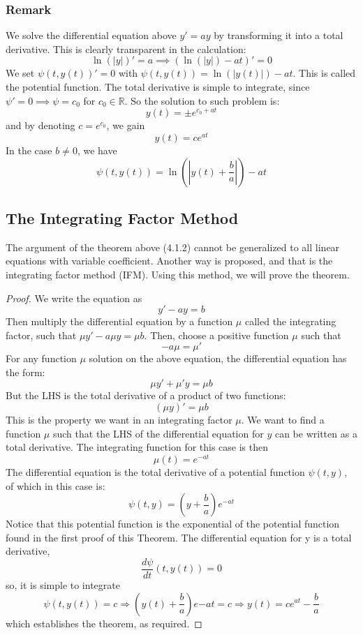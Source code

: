 \subsubsection{Remark}

We solve the differential equation above $y'=ay$ by transforming it into a total derivative. This is clearly transparent in the calculation:
$$\ln{(\lvert y \rvert )}'=a\implies(\ln{(\lvert y \rvert )}-at)'=0$$
We set $\psi(t,y(t))'=0$ with $\psi(t,y(t))=\ln{(\lvert y(t) \rvert)}-at$. This is called the potential function. The total derivative is simple to integrate, since $\psi'=0\implies \psi=c_{0}$ for $c_{0}\in \mathbb{R}$. So the solution to such problem is: $$y(t)=\pm e^{c_{0}+at}$$ and by denoting $c=e^{c_{0}}$, we gain $$y(t)=ce^{at}$$
In the case $b\neq 0$, we have $$\displaystyle{\psi (t,y(t))=\ln{\left( \left\lvert  y(t) + \frac{b}{a}  \right\rvert \right)}-at}$$

\subsection{The Integrating Factor Method}
The argument of the theorem above (4.1.2) cannot be generalized to all linear equations with variable coefficient. Another way is proposed, and that is the integrating factor method (IFM). Using this method, we will prove the theorem. 

\begin{proof}
    We write the equation as 
$$y'-ay=b$$
Then multiply the differential equation by a function $\mu$ called the integrating factor, such that $\mu y'-a\mu y=\mu b$. Then, choose a positive function $\mu$ such that $$-a\mu=\mu'$$
For any function $\mu$ solution on the above equation, the differential equation has the form: $$\mu y'+\mu'y=\mu b$$
But the LHS is the total derivative of a product of two functions: $$(\mu y)'=\mu b$$
This is the property we want in an integrating factor $\mu$. We want to find a function $\mu$ such that the LHS of the differential equation for $y$ can be written as a total derivative. The integrating function for this case is then $$\mu(t)=e^{-at}$$
The differential equation is the total derivative of a potential function $\psi(t,y)$, of which in this case is: $$\psi(t,y)=\left( y+\frac{b}{a} \right)e^{-at}$$ Notice that this potential function is the exponential of the potential function found in the first proof of this Theorem. The differential equation for y is a total derivative,
$$
\frac{d\psi}{dt} (t,y(t)) = 0
$$
so, it is simple to integrate 
\begin{equation*}
    \psi(t, y(t)) =  c \Rightarrow \left(y(t)+\frac{b}{a}\right) e{-at} = c \Rightarrow y(t) = ce^{at} - \frac{b}{a}
\end{equation*}
which establishes the theorem, as required. 
\end{proof}

